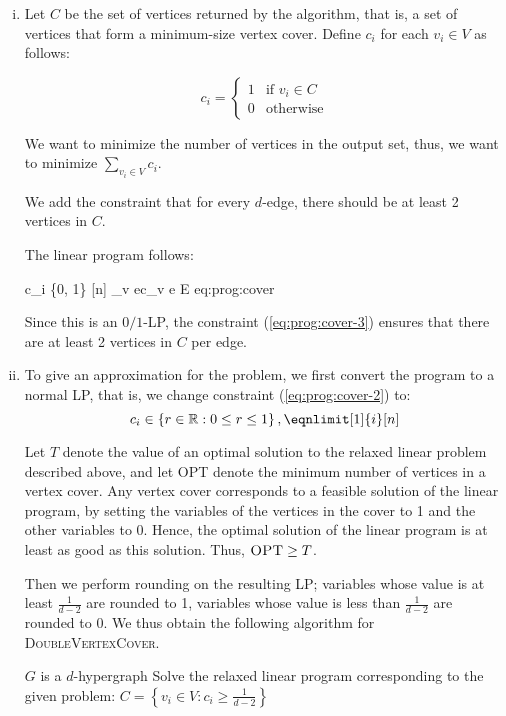 \begin{enumerate}[(i)]
	\item Let $C$ be the set of vertices returned by the algorithm, that is, a set of vertices that form a minimum-size vertex cover.
		Define $c_i$ for each $v_i \in V$ as follows:

		\[
			c_i =
				\begin{cases}
					1   & \text{if } v_i \in C\\
					0   & \text{otherwise}
				\end{cases}
		\]

		We want to minimize the number of vertices in the output set, thus, we want to minimize $\sum_{v_i \in V} c_i$.

		We add the constraint that for every $d$-edge, there should be at least 2 vertices in $C$.

		The linear program follows:

			{c_i \in \left\{0, 1\right\}}    {[n]}
			{\sum_{v \in e}{c_v} }    {e \in E}
			{eq:prog:cover}

		Since this is an $0/1$-LP, the constraint (\ref{eq:prog:cover-3}) ensures that there are at least 2 vertices in $C$ per edge.
	\item To give an approximation for the problem, we first convert the program to a normal LP, that is, we change constraint (\ref{eq:prog:cover-2}) to:
		\[
			c_i \in \left\{r \in \mathbb{R}: 0 \leq r \leq 1\right\}, \eqnlimit[1]{i}[n]
		\]

		Let $T$ denote the value of an optimal solution to the relaxed linear problem described above, and let \textsc{OPT} denote the minimum number of vertices in a vertex cover.
		Any vertex cover corresponds to a feasible solution of the linear program, by setting the variables of the vertices in the cover to 1 and the other variables to 0.
		Hence, the optimal solution of the linear program is at least as good as this solution.
		Thus, $\textsc{OPT} \geq T$.

		Then we perform rounding on the resulting LP; variables whose value is at least $\frac{1}{d-2}$ are rounded to 1, variables whose value is less than $\frac{1}{d-2}$ are rounded to 0.
		We thus obtain the following algorithm for \textsc{DoubleVertexCover}.

		\begin{sourcecode}
$G$ is a $d$-hypergraph
Solve the relaxed linear program corresponding to the given problem: 
$C = \left\{v_i \in V: c_i \geq \frac{1}{d-2}\right\}$
\qend
		\end{sourcecode}


\end{enumerate}
